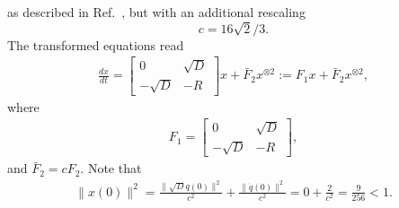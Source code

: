 \documentclass[superscriptaddress,onecolumn,nofootinbib,longbibliography,a4paper,accepted=2026-09-29]{quantumarticle}
\theoremstyle{plain}
\theoremstyle{definition}
\numberwithin{thm}{section}
\numberwithin{assumption}{section}
\numberwithin{lemma}{section}
\numberwithin{prop}{section}
\numberwithin{cor}{section}
\numberwithin{definition}{section}
\numberwithin{rmk}{section}
\numberwithin{equation}{section}
\begin{document}
as described in Ref.~\cite{krovi2024quantum}, but with an additional rescaling $$c = 16 \sqrt{2}/3.$$ The transformed equations read
\begin{align}
\label{eq:transformedoscillator}
    \frac{dx}{dt} = \begin{bmatrix}
       0 &  \sqrt{D} \\
       - \sqrt{D} & -R
   \end{bmatrix} x + \bar{F}_2 x^{\otimes 2} := F_1 x + \bar{F}_2 x^{\otimes 2},
\end{align}
where 
\begin{align}
    F_1 = \begin{bmatrix}
        0 & \sqrt{D} \\  - \sqrt{D} & -R
    \end{bmatrix},
\end{align}
and $\bar{F}_2 = c F_2$. Note that
\begin{align}
    \| x(0) \|^2 = \frac{\| \sqrt{D} q(0) \|^2}{c^2} +  \frac{\|\dot{q}(0)\|^2}{c^2} =  0 + \frac{2}{c^2} = \frac{9}{256}<1.
\end{align}
\end{document}
